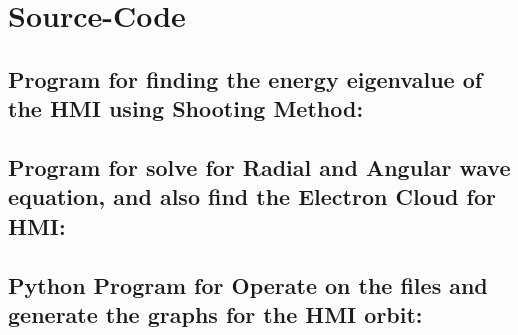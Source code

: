 \documentclass[12pt]{report}
\begin{document}
	\section{Source-Code}
		\subsection{Program for finding the energy eigenvalue of the HMI using Shooting Method:}
			 
		\subsection{Program for solve for Radial and Angular wave equation, and also find the Electron Cloud for HMI:}
			
		\subsection{Python Program for Operate on the files and generate the graphs for the HMI orbit:}
			
\end{document}
